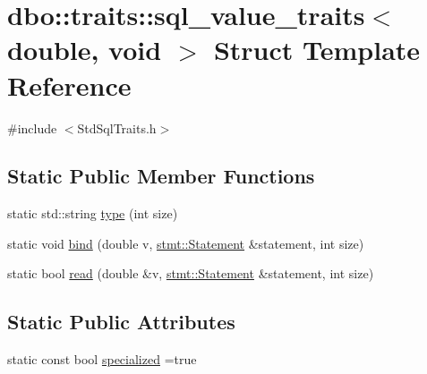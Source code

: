 \hypertarget{structdbo_1_1traits_1_1sql__value__traits_3_01double_00_01void_01_4}{\section{dbo\+:\+:traits\+:\+:sql\+\_\+value\+\_\+traits$<$ double, void $>$ Struct Template Reference}
\label{structdbo_1_1traits_1_1sql__value__traits_3_01double_00_01void_01_4}
}


{\ttfamily \#include $<$Std\+Sql\+Traits.\+h$>$}

\subsection*{Static Public Member Functions}
\begin{DoxyCompactItemize}
\item 
static std\+::string \hyperlink{structdbo_1_1traits_1_1sql__value__traits_3_01double_00_01void_01_4_a6149e10ec9b5a745c3f81bfcc378f6cc}{type} (int size)
\item 
static void \hyperlink{structdbo_1_1traits_1_1sql__value__traits_3_01double_00_01void_01_4_ae79e34f0874b56b12837a64079da6391}{bind} (double v, \hyperlink{classdbo_1_1stmt_1_1_statement}{stmt\+::\+Statement} \&statement, int size)
\item 
static bool \hyperlink{structdbo_1_1traits_1_1sql__value__traits_3_01double_00_01void_01_4_a4e0df83bf2a437059bc79f57d19b3589}{read} (double \&v, \hyperlink{classdbo_1_1stmt_1_1_statement}{stmt\+::\+Statement} \&statement, int size)
\end{DoxyCompactItemize}
\subsection*{Static Public Attributes}
\begin{DoxyCompactItemize}
\item 
static const bool \hyperlink{structdbo_1_1traits_1_1sql__value__traits_3_01double_00_01void_01_4_a14e7bfcf97852cc38bd78d0063772975}{specialized} =true
\end{DoxyCompactItemize}


